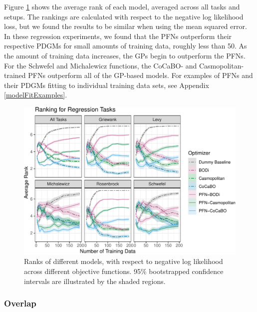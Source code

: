 \documentclass[12pt,twoside]{reedthesis}
\begin{document}
Figure \ref{fig:regression-experiment-rank-plot} shows the average rank of each model, averaged across all tasks and setups. The rankings are calculated with respect to the negative log likelihood loss, but we found the results to be similar when using the mean squared error. In these regression experiments, we found that the PFNs outperform their respective PDGMs for small amounts of training data, roughly less than 50. As the amount of training data increases, the GPs begin to outperform the PFNs. For the Schwefel and Michalewicz functions, the CoCaBO- and Casmopolitan-trained PFNs outperform all of the GP-based models. For examples of PFNs and their PDGMs fitting to individual training data sets, see Appendix \ref{modelFitExamples}.
\begin{figure}
\centering
\includegraphics{thesis_files/figure-latex/regression-experiment-rank-plot-1.pdf}
\caption{\label{fig:regression-experiment-rank-plot}Ranks of different models, with respect to negative log likelihood across different objective functions. 95\% bootstrapped confidence intervals are illustrated by the shaded regions.}
\end{figure}
\hypertarget{overlap}{%
\subsubsection{Overlap}\label{overlap}}
\end{document}

